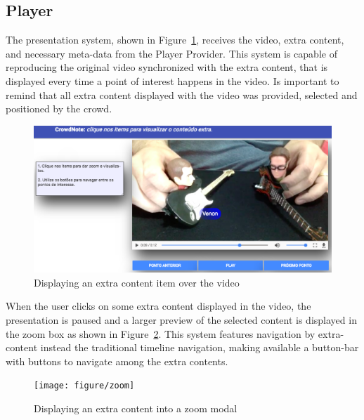 \pagebreak

\subsection{Player}

The presentation system, shown in Figure~\ref{player}, receives the video, extra content, and necessary meta-data from the Player Provider. This system is capable of reproducing the original video synchronized with the extra content, that is displayed every time a point of interest happens in the video. Is important to remind that all extra content displayed with the video was provided, selected and positioned by the crowd.

\begin{figure}[h!]
	\centerline{\includegraphics[scale=0.22] {figure/player}}
	\caption{Displaying an extra content item over the video}
	\label{player}
\end{figure}

When the user clicks on some extra content displayed in the video, the presentation is paused and a larger preview of the selected content is displayed in the zoom box as shown in Figure~\ref{zoom}. This system features navigation by extra-content instead the traditional timeline navigation, making available a button-bar with buttons to navigate among the extra contents.
 
\begin{figure}[h!]
	\centerline{\texttt{[image: figure/zoom]}}
	\caption{Displaying an extra content into a zoom modal}
	\label{zoom}
\end{figure}
